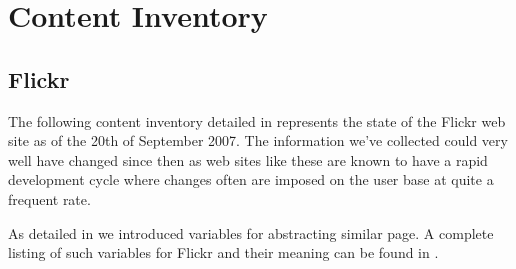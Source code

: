 \chapter{Content Inventory}
\label{appendix:content.inventory}

\section{Flickr}

The following content inventory detailed in
represents the state of the Flickr web site as of the 20th of September 2007.
The information we've collected could very well have changed since then as
web sites like these are known to have a rapid development cycle
where changes often are imposed on the user base at quite
a frequent rate.

As detailed in 
we introduced variables for abstracting
similar page. A complete listing of such variables for Flickr and their
meaning can be found in
.

